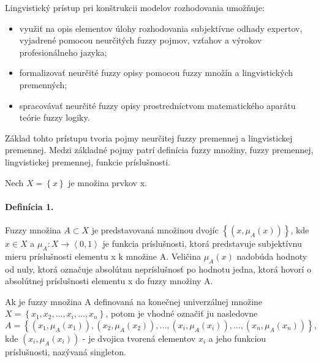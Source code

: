Lingvistický prístup pri konštrukcii modelov rozhodovania umožňuje\cite{levashenkoProj}: 
\begin{itemize}
	\item využiť na opis elementov úlohy rozhodovania subjektívne odhady expertov, vyjadrené pomocou neurčitých fuzzy pojmov, vzťahov a výrokov profesionálneho jazyka;
	\item formalizovať neurčité fuzzy opisy pomocou fuzzy množín a lingvistických premenných;
	\item spracovávať neurčité fuzzy opisy prostredníctvom matematického aparátu teórie fuzzy logiky. 
\end{itemize}

Základ tohto prístupu tvoria pojmy neurčitej fuzzy premennej a lingvistickej premennej. 
Medzi základné pojmy patrí definícia fuzzy množiny, fuzzy premennej, lingvistickej premennej, funkcie príslušnosti.\cite{levashenkoProj}

Nech $ X = \left\lbrace x \right\rbrace$ je množina prvkov x. 

\paragraph*{Definícia 1.} 
Fuzzy množina $A \subset X $ je predstavovaná množinou dvojíc $ \left\lbrace \left( x, \mu_A \left( x \right) \right) \right\rbrace  $, kde $ x \in X$ a $ \mu_A : X \longrightarrow \left\langle 0, 1\right\rangle $ je funkcia príslušnosti, ktorá predstavuje subjektívnu mieru príslušnosti elementu x k množine A. 
Veličina $\mu_A\left( x\right) $ nadobúda hodnoty od nuly, ktorá označuje absolútnu nepríslušnosť po hodnotu jedna, ktorá hovorí o absolútnej príslušnosti elementu x do fuzzy množiny A. \cite{levashenkoProj, Zadeh1965}

Ak je fuzzy množina A definovaná na konečnej univerzálnej množine 
\\
 $X = \left\lbrace x_1, x_2, ... , x_i, ..., x_n\right\rbrace $, potom je vhodné označiť ju nasledovne
$$
A = \left\lbrace 
\left( x_1, \mu_A\left( x_1\right)  \right) , 
\left( x_2, \mu_A\left( x_2\right)  \right) , ... , 
\left( x_i, \mu_A\left( x_i\right)  \right) , ... , 
\left( x_n, \mu_A\left( x_n\right)  \right) 
 \right\rbrace , 
$$ 
kde $\left( x_i, \mu_A\left( x_i\right)  \right)$ - je dvojica tvorená elementov $x_i$ a jeho funkciou príslušnosti, nazývaná singleton. \cite{levashenkoProj}

